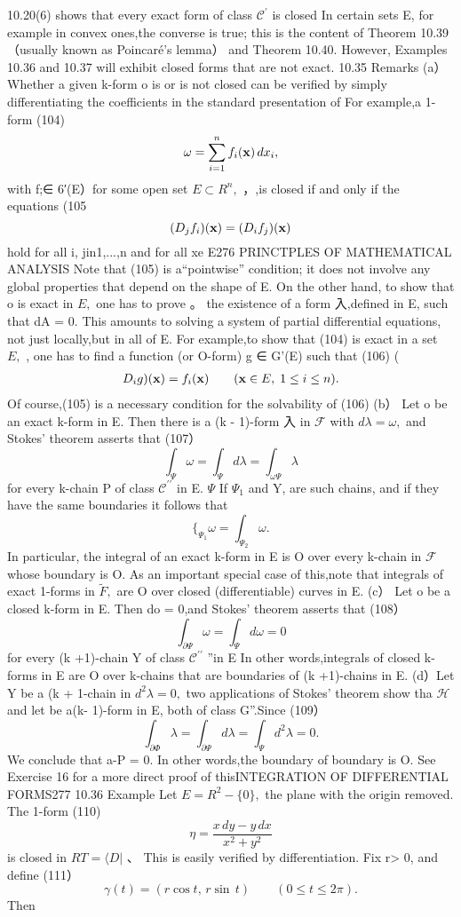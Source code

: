 10.20(6) shows that every exact form of class ${\mathcal{C}}^{\prime}$ is closed In certain sets E, for example in convex ones,the converse is true; this is the content of Theorem 10.39（usually known as Poincaré's lemma） and Theorem 10.40. However, Examples 10.36 and 10.37 will exhibit closed forms that are not exact. 10.35 Remarks (a） Whether a given k-form o is or is not closed can be verified by simply differentiating the coefficients in the standard presentation of For example,a 1-form (104) $$ \omega=\sum_{i=1}^{n}f_{i}({\bf x})\,d x_{i}, $$ with f;∈ 6′(E）for some open set $E\subset R^{n},$ ，,is closed if and only if the equations (105 $$ (D_{j}f_{i})({\bf x})=(D_{i}f_{j})({\bf x}) $$ hold for all i, jin{1,...,n} and for all xe E276 PRINCTPLES OF MATHEMATICAL ANALYSIS Note that (105) is a“pointwise” condition; it does not involve any global properties that depend on the shape of E. On the other hand, to show that o is exact in $\textstyle E,$ one has to prove 。 the existence of a form 入,defined in E, such that dA = 0. This amounts to solving a system of partial differential equations, not just locally,but in all of E. For example,to show that (104) is exact in a set $\textstyle E,$ , one has to find a function (or O-form) g ∈ G'(E) such that (106) ( $$ \begin{array}{r l}{D_{i}g)(\mathbf{x})=f_{i}(\mathbf{x})}&{{}\quad(\mathbf{x}\in E,\;1\leq i\leq n).}\end{array} $$ Of course,(105) is a necessary condition for the solvability of (106) (b） Let o be an exact k-form in E. Then there is a (k - 1)-form 入 in ${\mathcal{F}}$ with $d\lambda=\omega,$ and Stokes' theorem asserts that (107） $$ \int_{\Psi}\omega=\int_{\Psi}d\lambda=\int_{\omega\Psi}\lambda $$ for every k-chain P of class ${\mathcal{C}}^{\prime\prime}$ in E. $\Psi$ If $\Psi_{1}$ and Y, are such chains, and if they have the same boundaries it follows that $$ \Bigr\{_{\Psi_{1}}\omega=\int_{\Psi_{2}}\omega. $$ In particular, the integral of an exact k-form in E is O over every k-chain in ${\mathcal{F}}$ whose boundary is O. As an important special case of this,note that integrals of exact 1-forms in ${\widetilde{F}},$ are O over closed (differentiable) curves in E. (c） Let o be a closed k-form in E. Then do = 0,and Stokes' theorem asserts that (108） $$ \int_{\partial\Psi}\omega=\int_{\Psi}d\omega=0 $$ for every (k +1)-chain Y of class ${\mathcal{C}}^{\prime\prime}$ ”in E In other words,integrals of closed k-forms in E are O over k-chains that are boundaries of (k +1)-chains in E. (d）Let Y be a (k + 1-chain in $d^{2}\lambda=0,$ two applications of Stokes' theorem show tha ${\mathcal{H}}$ and let be a(k- 1)-form in E, both of class G”.Since (109） $$ \int_{\partial\Phi}\lambda=\int_{\partial\Psi}d\lambda=\int_{\Psi}d^{2}\lambda=0. $$ We conclude that a-P = 0. In other words,the boundary of boundary is O. See Exercise 16 for a more direct proof of thisINTEGRATION OF DIFFERENTIAL FORMS277 10.36 Example Let $E=R^{2}-\{0\},$ the plane with the origin removed. The 1-form (110) $$ \eta={\frac{x\,d y-y\,d x}{x^{2}+y^{2}}} $$ is closed in $\scriptstyle R T=\langle D|$ 、 This is easily verified by differentiation. Fix r> 0, and define (111） $$ \gamma(t)=(r\cos t,\,r\sin\,t)\qquad(0\leq t\leq2\pi). $$ Then 